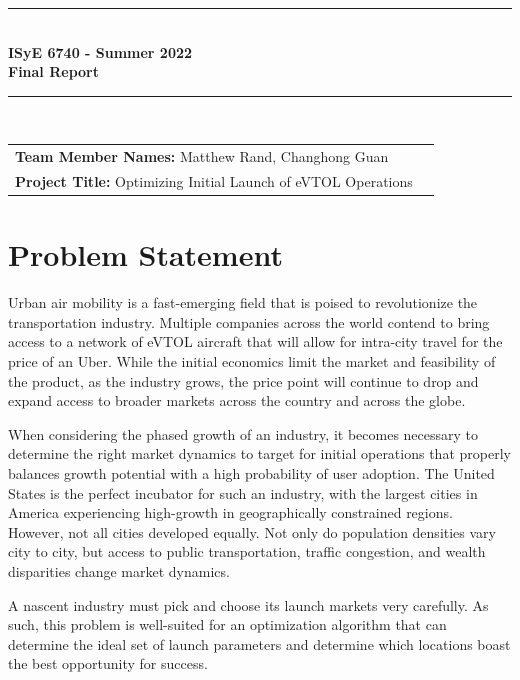 \documentclass{article}
\begin{document}
\onehalfspacing
\begin{titlepage}
	\clearpage\thispagestyle{empty}
	\centering
	\vspace{1cm}
		
	\rule{\linewidth}{1mm} \\[0.5cm]
	{ \Large \bfseries ISyE 6740 - Summer 2022\\[0.2cm]
		Final Report}\\[0.5cm]
	\rule{\linewidth}{1mm} \\[1cm]
	
		\begin{tabular}{l p{5cm}}
		\textbf{Team Member Names:} Matthew Rand, Changhong Guan &   \\[10pt]
		\textbf{Project Title:} Optimizing Initial Launch of eVTOL Operations &  \\[10pt]
		\end{tabular} 
	
	\tableofcontents
	
\end{titlepage}

\section{Problem Statement}
		
Urban air mobility is a fast-emerging field that is poised to revolutionize the transportation industry. Multiple companies across the world contend to bring access to a network of eVTOL aircraft that will allow for intra-city travel for the price of an Uber. While the initial economics limit the market and feasibility of the product, as the industry grows, the price point will continue to drop and expand access to broader markets across the country and across the globe.

When considering the phased growth of an industry, it becomes necessary to determine the right market dynamics to target for initial operations that properly balances growth potential with a high probability of user adoption. The United States is the perfect incubator for such an industry, with the largest cities in America experiencing high-growth in geographically constrained regions. However, not all cities developed equally. Not only do population densities vary city to city, but access to public transportation, traffic congestion, and wealth disparities change market dynamics.

A nascent industry must pick and choose its launch markets very carefully. As such, this problem is well-suited for an optimization algorithm that can determine the ideal set of launch parameters and determine which locations boast the best opportunity for success.
\end{document}
